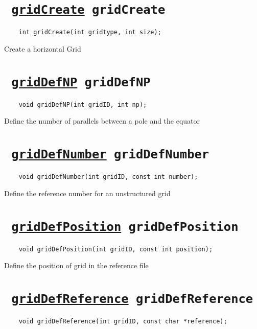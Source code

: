

\section*{\tt 
\ifpdf
\hyperref[gridCreate]{gridCreate}
\else
gridCreate
\fi
}
\begin{verbatim}
    int gridCreate(int gridtype, int size);
\end{verbatim}

Create a horizontal Grid
\ifpdfoutput{}{(\ref{gridCreate})}


\section*{\tt 
\ifpdf
\hyperref[gridDefNP]{gridDefNP}
\else
gridDefNP
\fi
}
\begin{verbatim}
    void gridDefNP(int gridID, int np);
\end{verbatim}

Define the number of parallels between a pole and the equator
\ifpdfoutput{}{(\ref{gridDefNP})}


\section*{\tt 
\ifpdf
\hyperref[gridDefNumber]{gridDefNumber}
\else
gridDefNumber
\fi
}
\begin{verbatim}
    void gridDefNumber(int gridID, const int number);
\end{verbatim}

Define the reference number for an unstructured grid
\ifpdfoutput{}{(\ref{gridDefNumber})}


\section*{\tt 
\ifpdf
\hyperref[gridDefPosition]{gridDefPosition}
\else
gridDefPosition
\fi
}
\begin{verbatim}
    void gridDefPosition(int gridID, const int position);
\end{verbatim}

Define the position of grid in the reference file
\ifpdfoutput{}{(\ref{gridDefPosition})}


\section*{\tt 
\ifpdf
\hyperref[gridDefReference]{gridDefReference}
\else
gridDefReference
\fi
}
\begin{verbatim}
    void gridDefReference(int gridID, const char *reference);
\end{verbatim}


